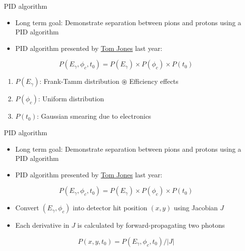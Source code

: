 \documentclass[xcolor={dvipsnames}]{beamer}
\begin{document}
\begin{frame}{PID algorithm}
  \begin{itemize}
    \setlength\itemsep{1.0em}
    \item{Long term goal: Demonstrate separation between pions and protons using a PID algorithm}
    \item{PID algorithm presented by \href{https://indico.cern.ch/event/1204659/timetable/\#21-wp3-torch-reconstruction}{Tom Jones} last year:}
  \end{itemize}
  \vspace{0.4cm}
  \begin{equation*}
    P(E_\gamma, \phi_c, t_0) = P(E_\gamma)\times P(\phi_c)\times P(t_0)
  \end{equation*}
  \begin{enumerate}
    \setlength\itemsep{1.0em}
    \item{$P(E_\gamma)$: Frank-Tamm distribution $\circledast$ Efficiency effects}
    \item{$P(\phi_c)$: Uniform distribution}
    \item{$P(t_0)$: Gaussian smearing due to electronics}
  \end{enumerate}
\end{frame}

\begin{frame}{PID algorithm}
  \begin{itemize}
    \setlength\itemsep{1.0em}
    \item{Long term goal: Demonstrate separation between pions and protons using a PID algorithm}
    \item{PID algorithm presented by \href{https://indico.cern.ch/event/1204659/timetable/\#21-wp3-torch-reconstruction}{Tom Jones} last year:}
  \end{itemize}
  \vspace{0.4cm}
  \begin{equation*}
    P(E_\gamma, \phi_c, t_0) = P(E_\gamma)\times P(\phi_c)\times P(t_0)
  \end{equation*}
  \begin{itemize}
    \setlength\itemsep{1.0em}
    \item{Convert $(E_\gamma, \phi_c)$ into detector hit position $(x, y)$ using Jacobian $J$}
    \item{Each derivative in $J$ is calculated by forward-propagating two photons}
  \end{itemize}
  \vspace{0.4cm}
  \begin{equation*}
    P(x, y, t_0) = P(E_\gamma, \phi_c, t_0)/\lvert J\rvert
  \end{equation*}
  \vspace{-0.63cm}
\end{frame}
\end{document}
